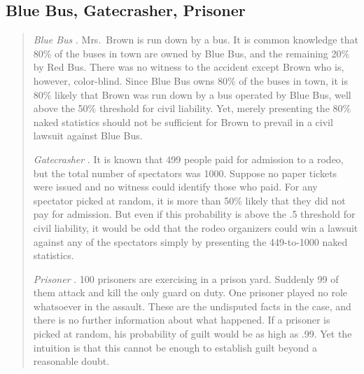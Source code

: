 \documentclass{article}
\begin{document}
\subsection{Blue Bus, Gatecrasher, Prisoner}

\begin{quote}
\textit{Blue Bus} \citep{tribe71}. Mrs.\ Brown is run down by a bus. It is common knowledge that 80\% of the buses in town are owned by Blue Bus, and the remaining 20\% by Red Bus. There was no witness to the accident except Brown who is, however, color-blind. Since Blue Bus owns 80\% of the buses in town, it is 80\% likely that Brown was run down by a bus operated by Blue Bus, well above the 50\% threshold for civil liability.  Yet, merely presenting the 80\% naked statistics should not be sufficient for Brown to prevail in a civil lawsuit against Blue Bus.


\textit{Gatecrasher} \citep{Cohen1977The-probable-an}. It is known that 499 people paid for
admission to a rodeo, but the total number of spectators was 1000. Suppose no paper tickets were issued and 
no witness could identify 
those who paid.  For any spectator picked at random, it is more than 50\% likely that they did not pay for admission. But even if this probability is above the .5 threshold for civil liability, it would be odd that the rodeo organizers could win a lawsuit against any of the spectators simply by presenting the 449-to-1000 naked statistics. 


\textit{Prisoner} \citep{Nesson1979Reasonable-doub}. 100 prisoners are exercising in a prison yard. Suddenly 99 of them attack and kill the only guard on duty. One prisoner played no role whatsoever in the assault. These are the undisputed facts in the case, and there is no further information about what happened. If a prisoner is picked at random, his probability of guilt would be as high as .99.  Yet the intuition is that this cannot be enough to establish guilt beyond a reasonable doubt. 
\end{quote}
\end{document}
